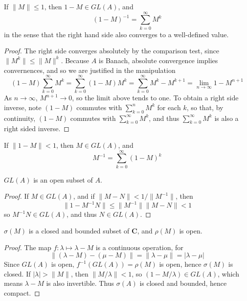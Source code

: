 \begin{lemma}
    If $\|M\| \leq 1$, then $1 - M \in GL(A)$, and
    \[ (1 - M)^{-1} = \sum_{k = 0}^\infty M^k \]
    in the sense that the right hand side also converges to a well-defined value.
\end{lemma}
\begin{proof}
    The right side converges absolutely by the comparison test, since $\| M^k \| \leq \| M \|^k$. Because $A$ is Banach, absolute convergence implies convernences, and so we are justified in the manipulation
    \[ (1 - M) \sum_{k = 0}^\infty M^k = \sum_{k = 0}^\infty (1 - M)M^k = \sum_{k = 0}^\infty M^k - M^{k+1} = \lim_{n \to \infty} 1 - M^{n+1} \]
    As $n \to \infty$, $M^{n+1} \to 0$, so the limit above tends to one. To obtain a right side inverse, note $(1 - M)$ commutes with $\sum_{k = 0}^n M^k$ for each $k$, so that, by continuity, $(1 - M)$ commutes with $\sum_{k = 0}^\infty M^k$, and thus $\sum_{k = 0}^\infty M^k$ is also a right sided inverse.
\end{proof}

\begin{corollary}
    If $\| 1 - M \| < 1$, then $M \in GL(A)$, and
    \[ M^{-1} = \sum_{k = 0}^\infty (1 - M)^k \]
\end{corollary}

\begin{corollary}
    $GL(A)$ is an open subset of $A$.
\end{corollary}
\begin{proof}
    If $M \in GL(A)$, and if $\| M - N \| < 1/\| M^{-1} \|$, then
    \[ \| 1 - M^{-1}N \| \leq \| M^{-1} \| \| M - N \|  < 1 \]
    so $M^{-1}N \in GL(A)$, and thus $N \in GL(A)$.
\end{proof}

\begin{corollary}
    $\sigma(M)$ is a closed and bounded subset of $\mathbf{C}$, and $\rho(M)$ is open.
\end{corollary}
\begin{proof}
    The map $f: \lambda \mapsto \lambda - M$ is a continuous operation, for
    \[ \| (\lambda - M) - (\mu - M) \| = \| \lambda - \mu \| = | \lambda - \mu | \]
    Since $GL(A)$ is open, $f^{-1}(GL(A)) = \rho(M)$ is open, hence $\sigma(M)$ is closed. If $|\lambda| > \|M\|$, then $\| M/\lambda \| < 1$, so $(1 - M/\lambda) \in GL(A)$, which means $\lambda - M$ is also invertible. Thus $\sigma(A)$ is closed and bounded, hence compact.
\end{proof}

